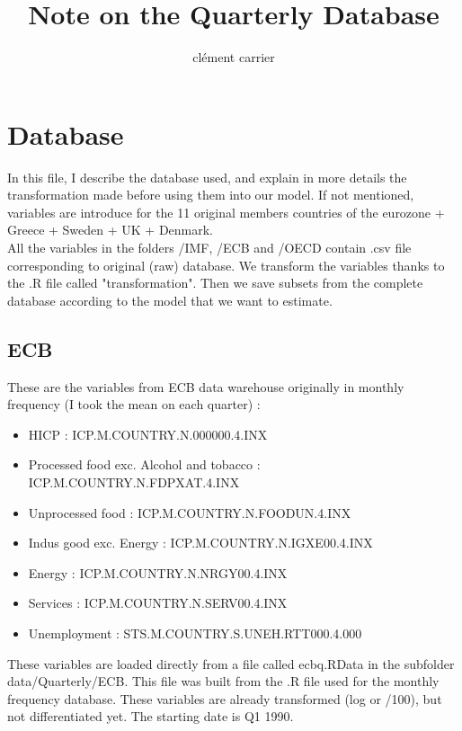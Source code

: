 \documentclass[11pt,a4paper]{article}
\title{Note on the Quarterly Database}
\author{clément carrier}
\begin{document}
\maketitle

\section{Database}

In this file, I describe the database used, and explain in more details the transformation made before using them into our model. If not mentioned, variables are introduce for the 11 original members countries of the eurozone + Greece + Sweden + UK + Denmark.\\

All the variables in the folders /IMF, /ECB and /OECD contain .csv file corresponding to original (raw) database. We transform the variables thanks to the .R file called "transformation". Then we save subsets from the complete database according to the model that we want to estimate. 




\subsection{ECB}

These are the variables from ECB data warehouse originally in monthly frequency (I took the mean on each quarter) : 
\begin{itemize}
\item HICP : ICP.M.COUNTRY.N.000000.4.INX
\item Processed food exc. Alcohol and tobacco : ICP.M.COUNTRY.N.FDPXAT.4.INX
\item Unprocessed food	: ICP.M.COUNTRY.N.FOODUN.4.INX
\item Indus good exc. Energy : ICP.M.COUNTRY.N.IGXE00.4.INX
\item Energy	:	ICP.M.COUNTRY.N.NRGY00.4.INX
\item Services	:	ICP.M.COUNTRY.N.SERV00.4.INX
\item Unemployment : STS.M.COUNTRY.S.UNEH.RTT000.4.000
\end{itemize}

\vspace{0.5cm}

These variables are loaded directly from a file called ecbq.RData in the subfolder data/Quarterly/ECB. This file was built from the .R file used for the monthly frequency database. These variables are already transformed (log or /100), but not differentiated yet. The starting date is Q1 1990. \\
\end{document}

